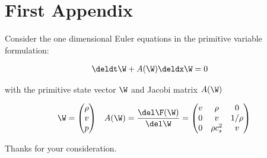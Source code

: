 \chapter{First Appendix}


Consider the one dimensional Euler equations in the primitive variable formulation:

\begin{align}
    \deldt \W + A(\W) \deldx \W = 0 &&
\end{align}

with the primitive state vector $\W$ and Jacobi matrix $A(\W)$

\begin{align}
    \W = \begin{pmatrix}
          \rho \\ v \\ p
         \end{pmatrix}
&&
    A(\W) = \frac{\del \F(\W)}{\del \W} = 
            \begin{pmatrix}
              v & \rho & 0 \\
              0 & v & 1/\rho \\
              0 & \rho c_s^2 & v
             \end{pmatrix}
\end{align}

Thanks for your consideration.

